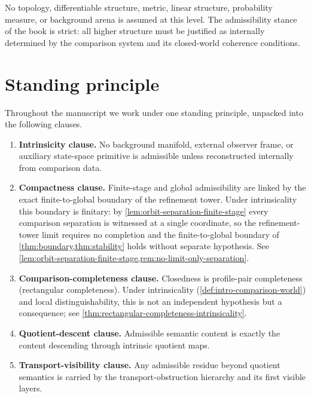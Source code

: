No topology, differentiable structure, metric, linear structure,
probability measure, or background arena is assumed at this level.
The admissibility stance of the book is strict:
all higher structure must be justified as internally determined by the
comparison system and its closed-world coherence conditions.

\section{Standing principle}
\begin{standingprinciple}
\label{sp:closed-world}
Throughout the manuscript we work under one standing principle, unpacked
into the following clauses.
\begin{enumerate}[label=\textup{(SP\arabic*)}]
\item\label{sp:intrinsic}
      \textbf{Intrinsicity clause.}
      No background manifold, external observer frame, or auxiliary
      state-space primitive is admissible unless reconstructed internally
      from comparison data.
\item\label{sp:compactness}
      \textbf{Compactness clause.}
	  Finite-stage and global admissibility are linked by the exact
	  finite-to-global boundary of the refinement tower. Under
	  intrinsicality this boundary is finitary: by
	  \cref{lem:orbit-separation-finite-stage} every comparison separation is
	  witnessed at a single coordinate, so the refinement-tower limit requires
	  no completion and the finite-to-global boundary of
	  \cref{thm:boundary,thm:stability} holds without separate hypothesis. See
	  \cref{lem:orbit-separation-finite-stage,rem:no-limit-only-separation}.
\item\label{sp:closure}
      \textbf{Comparison-completeness clause.}
	  Closedness is profile-pair completeness (rectangular completeness).
	  Under intrinsicality (\cref{def:intro-comparison-world}) and local
	  distinguishability, this is not an independent hypothesis but a
	  consequence; see \cref{thm:rectangular-completeness-intrinsicality}.
\item\label{sp:quotient}
	      \textbf{Quotient-descent clause.}
      Admissible semantic content is exactly the content descending through
      intrinsic quotient maps.
\item\label{sp:transport}
      \textbf{Transport-visibility clause.}
      Any admissible residue beyond quotient semantics is carried by the
      transport-obstruction hierarchy and its first visible layers.
\end{enumerate}
\end{standingprinciple}
